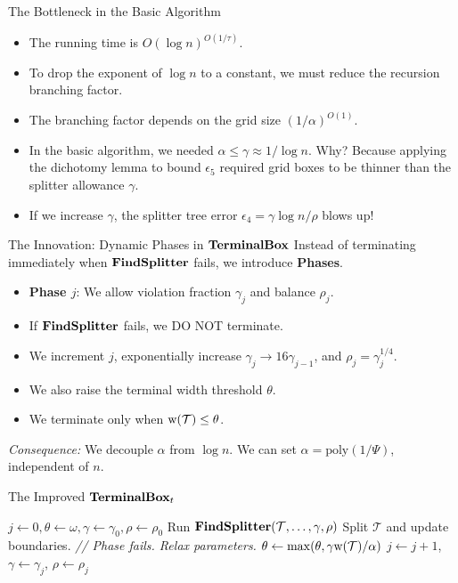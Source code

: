 \documentclass[11pt,aspectratio=169]{beamer}
\newcommand{\errorcont}{\Psi}
\newcommand{\terminalbox}{{\rm{\bf TerminalBox}}}
\newcommand{\width}{{\bf {\rm  w}}}
\newcommand{\findsplitter}{{\rm {\bf FindSplitter}}}
\begin{document}
\begin{frame}{The Bottleneck in the Basic Algorithm}
    \begin{itemize}
        \item The running time is $O(\log n)^{O(1/\tau)}$.
        \item To drop the exponent of $\log n$ to a constant, we must reduce the recursion branching factor.
        \item The branching factor depends on the grid size $(1/\alpha)^{O(1)}$.
        \item In the basic algorithm, we needed $\alpha \leq \gamma \approx 1/\log n$. Why? Because applying the dichotomy lemma to bound $\epsilon_5$ required grid boxes to be thinner than the splitter allowance $\gamma$.
        \item If we increase $\gamma$, the splitter tree error $\epsilon_4 = \gamma \log n / \rho$ blows up!
    \end{itemize}
\end{frame}

\begin{frame}{The Innovation: Dynamic Phases in $\terminalbox$}
    Instead of terminating immediately when $\findsplitter$ fails, we introduce \textbf{Phases}.
    
    \begin{itemize}
        \item \textbf{Phase $j$}: We allow violation fraction $\gamma_j$ and balance $\rho_j$.
        \item If $\findsplitter$ fails, we DO NOT terminate.
        \item We increment $j$, exponentially increase $\gamma_j \to 16 \gamma_{j-1}$, and $\rho_j = \gamma_j^{1/4}$.
        \item We also raise the terminal width threshold $\theta$.
        \item We terminate only when $\width(\mathcal{T}) \leq \theta$.
    \end{itemize}
    \vspace{0.5cm}
    \textit{Consequence:} We decouple $\alpha$ from $\log n$. We can set $\alpha = \text{poly}(1/\errorcont)$, independent of $n$.
\end{frame}

\begin{frame}{The Improved $\terminalbox_t$}
    \begin{algorithmic}[1]
        \State $j \gets 0, \theta \gets \omega, \gamma \gets \gamma_0, \rho \gets \rho_0$
        \While{$\width(\mathcal{T}) > \theta$}
            \State Run $\findsplitter(\mathcal{T}, \dots, \gamma, \rho)$
                \State Split $\mathcal{T}$ and update boundaries.
            \Else
                \State \textit{// Phase fails. Relax parameters.}
                \State $\theta \gets \max(\theta, \gamma \width(\mathcal{T}) / \alpha)$
                \State $j \gets j+1$, $\gamma \gets \gamma_j$, $\rho \gets \rho_j$
            \EndIf
        \EndWhile
    \end{algorithmic}
\end{frame}
\end{document}

